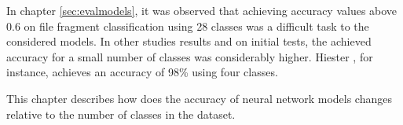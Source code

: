 In chapter \ref{sec:evalmodels}, it was observed that achieving accuracy values above 0.6 on file fragment classification using 28 classes was a difficult task to the considered models. In other studies results \cite{hiester_file_2018} \cite{sportiello_context-based_2012} \cite{amirani_feature-based_2013} \cite{maslim_distributed_2014} and on initial tests, the achieved accuracy for a small number of classes was considerably higher. Hiester \cite{hiester_file_2018}, for instance, achieves an accuracy of 98\% using four classes.

This chapter describes how does the accuracy of neural network models changes relative to the number of classes in the dataset.

